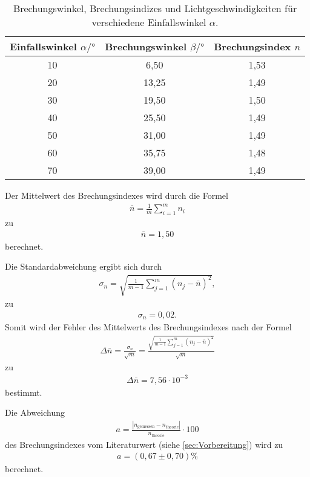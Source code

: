 \begin{table}[H]
  \centering
  \caption{Brechungswinkel, Brechungsindizes und Lichtgeschwindigkeiten für verschiedene Einfallswinkel $\alpha$.}
  \label{tab:Brechung}
  \begin{tabular}{S S S}
  \toprule
  {Einfallswinkel $\alpha / \si{\degree}$} &{Brechungswinkel $\beta / \si{\degree}$} & {Brechungsindex $n$}\\
    & 6,50  & 1,53 \\
  20  & 13,25 & 1,49 \\
  30  & 19,50 & 1,50 \\
  40  & 25,50 & 1,49 \\
  50  & 31,00 & 1,49 \\
  60  & 35,75 & 1,48 \\
  70  & 39,00 & 1,49 \\
  \bottomrule
  \end{tabular}
\end{table}


Der Mittelwert des Brechungsindexes wird durch die Formel
\begin{align}
    \bar{n}=\frac{1}{m} \sum_{i=1}^m n_i
    \label{eqn:Mittelwert}
\end{align}
zu 
\begin{align*}
  \bar{n}=1,50
\end{align*}
berechnet.

Die Standardabweichung ergibt sich durch
\begin{align}
    \sigma_n=\sqrt{\frac{1}{m-1}\sum_{j=1}^m (n_j-\bar{n})^2},
    \label{eqn:Standardabweichung}
\end{align}
zu
\begin{align*}
  \sigma_n= 0,02.
\end{align*}
Somit wird der Fehler des Mittelwerts des Brechungsindexes nach der Formel
\begin{align}
    \Delta \bar{n}= \frac{\sigma_n}{\sqrt{m}} = \frac{\sqrt{\frac{1}{m-1}\sum_{j=1}^m (n_j-\bar{n})^2}}{\sqrt{m}}
    \label{eqn:Fehler}
\end{align}
zu 
\begin{align*}
  \Delta \bar{n}=7,56 \cdot 10^{-3}
\end{align*}
bestimmt.

Die Abweichung 
\begin{align}
  a=\frac{|n_\mathrm{gemessen}-n_\mathrm{theorie}|}{n_\mathrm{theorie}}\cdot 100 \label{eqn:abweich}
\end{align}
des Brechungsindexes vom Literaturwert (siehe \autoref{sec:Vorbereitung}) wird zu
\begin{align*}
  a=(0,67 \pm 0,70) \si{\percent}
\end{align*}
berechnet.


